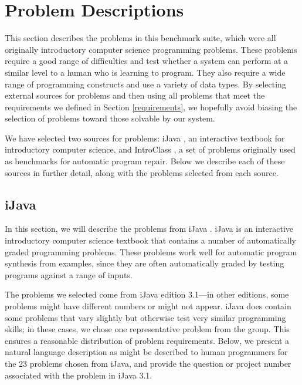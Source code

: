\documentclass{sig-alternate}
\begin{document}
\section{Problem Descriptions} \label{descriptionsSection}

This section describes the problems in this benchmark suite, which were all originally introductory computer science programming problems. These problems require a good range of difficulties and test whether a system can perform at a similar level to a human who is learning to program. They also require a wide range of programming constructs and use a variety of data types. By selecting external sources for problems and then using all problems that meet the requirements we defined in Section \ref{requirements}, we hopefully avoid biasing the selection of problems toward those solvable by our system.

We have selected two sources for problems: iJava \cite{iJava}, an interactive textbook for introductory computer science, and IntroClass \cite{ManyBugsAndIntroClass, Brun13TRgptest}, a set of problems originally used as benchmarks for automatic program repair. Below we describe each of these sources in further detail, along with the problems selected from each source.

\subsection{iJava}

In this section, we will describe the problems from iJava \cite{iJava, Moll:2011:IOI:1968521.1968535}. iJava is an interactive introductory computer science textbook that contains a number of automatically graded programming problems. These problems work well for automatic program synthesis from examples, since they are often automatically graded by testing programs against a range of inputs. 

The problems we selected come from iJava edition 3.1---in other editions, some problems might have different numbers or might not appear. iJava does contain some problems that vary slightly but otherwise test very similar programming skills; in these cases, we chose one representative problem from the group. This ensures a reasonable distribution of problem requirements. Below, we present a natural language description as might be described to human programmers for the 23 problems chosen from iJava, and provide the question or project number associated with the problem in iJava 3.1.
\end{document}
